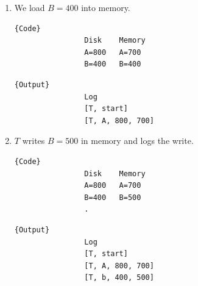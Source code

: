 \documentclass{article}
\begin{document}
\begin{example}
\begin{enumerate}
            \noindent\begin{minipage}{.46\textwidth}
              \begin{lstlisting}[]{Code}
                Disk    Memory
                A=800   A=700
                B=400
              \end{lstlisting}
              \end{minipage}
              \hfill
              \begin{minipage}{.45\textwidth}
              \begin{lstlisting}[]{Output}
                Log 
                [T, start]
                [T, A, 800, 700]
              \end{lstlisting}
            \end{minipage}

          \item We load $B=400$ into memory. 

            \noindent\begin{minipage}{.46\textwidth}
              \begin{lstlisting}[]{Code}
                Disk    Memory
                A=800   A=700
                B=400   B=400
              \end{lstlisting}
              \end{minipage}
              \hfill
              \begin{minipage}{.45\textwidth}
              \begin{lstlisting}[]{Output}
                Log 
                [T, start]
                [T, A, 800, 700]
              \end{lstlisting}
            \end{minipage}

          \item $T$ writes $B=500$ in memory and logs the write. 

            \noindent\begin{minipage}{.46\textwidth}
              \begin{lstlisting}[]{Code}
                Disk    Memory
                A=800   A=700
                B=400   B=500
                .
              \end{lstlisting}
              \end{minipage}
              \hfill
              \begin{minipage}{.45\textwidth}
              \begin{lstlisting}[]{Output}
                Log 
                [T, start]
                [T, A, 800, 700]
                [T, b, 400, 500]
              \end{lstlisting}
            \end{minipage}


\end{enumerate}
\end{example}
\end{document}
